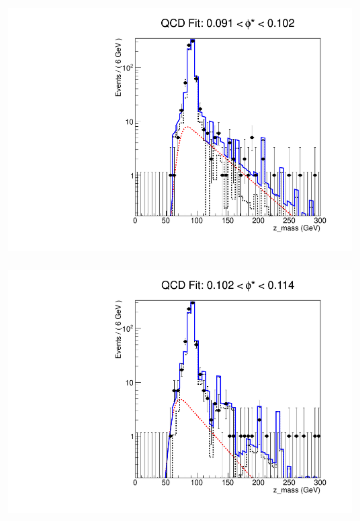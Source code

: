 \begin{figure}[!htbp]
    \centering
    \begin{subfigure}[b]{0.5\textwidth}
        \includegraphics[width=\linewidth]{figures/qcd_fits/qcd_fit_plot_for_17.pdf}
        \caption{}
        \label{fig:qcd_fit_17}
    \end{subfigure}%
    \begin{subfigure}[b]{0.5\textwidth}
        \includegraphics[width=\linewidth]{figures/qcd_fits/qcd_fit_plot_for_18.pdf}
        \caption{}
        \label{fig:qcd_fit_18}
    \end{subfigure}
    \begin{subfigure}[b]{0.5\textwidth}

\end{subfigure}
\end{figure}
